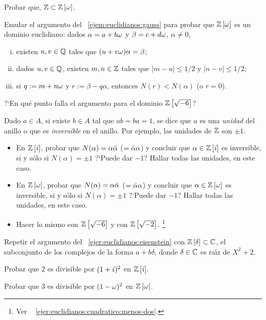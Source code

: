\begin{ejerEuclidianos}
\begin{enumerate}[(i)]
			Probar que, $\mathbb{Z}\subset{\ensuremath{\mathbb{Z}}}\left[\omega\right]$.
	\end{enumerate}
	Emular el argumento del \ejemname~\ref{ejem:euclidianos:gauss} para
	probar que ${\mathbb{Z}}\left[\omega\right]$ es un dominio euclidiano: dados
	$\alpha=a+b\omega$ y $\beta=c+d\omega$, $\alpha\neq 0$,
	\begin{enumerate}[(i)]
		\item\label{item:ejer:euclidianos:eisenstein:i}
			existen $u,v\in\mathbb{Q}$ tales que
			$(u+v\omega)\alpha=\beta$;
		\item\label{item:ejer:euclidianos:eisenstein:ii}
			dados $u,v\in\mathbb{Q}$, existen $m,n\in\mathbb{Z}$
			tales que $|m-u|\leq 1/2$ y $|n-v|\leq 1/2$;
		\item\label{item:ejer:euclidianos:eisenstein:iii}
			si $q:=m+n\omega$ y $r:=\beta-q\alpha$, entonces
			$N(r)<N(\alpha)$ (o $r=0$).
	\end{enumerate}
	?`En qu\'e punto falla el argumento para el dominio
	${\mathbb{Z}}\left[\sqrt{-6}\right]$?
\end{ejerEuclidianos}

\begin{ejerEuclidianos}\label{ejer:euclidianos:unidades}
	Dado $a\in A$, si existe $b\in A$ tal que $ab=ba=1$, se dice que
	$a$ es una \emph{unidad} del anillo o que es \emph{inversible} en el
	anillo. Por ejemplo, las unidades de $\mathbb{Z}$ son $\pm 1$.
	\begin{itemize}
		\item En ${\mathbb{Z}}\left[\mathit i\right]$, probar que
			$N(\alpha)=\alpha\bar{\alpha}$ ($=\bar{\alpha}\alpha$) y
			concluir que $\alpha\in{\ensuremath{\mathbb{Z}}}\left[\mathit i\right]$ es inversible,
			si y s\'olo si $N(\alpha)=\pm 1$ ?`Puede dar $-1$?
			Hallar todas las unidades, en este caso.
		\item En ${\mathbb{Z}}\left[\omega\right]$, probar que
			$N(\alpha)=\alpha\bar{\alpha}$ ($=\bar{\alpha}\alpha$) y
			concluir que $\alpha\in{\ensuremath{\mathbb{Z}}}\left[\omega\right]$ es
			inversible, si y s\'olo si $N(\alpha)=\pm 1$ ?`Puede
			dar $-1$? Hallar todas las unidades, en este caso.
		\item Hacer lo mismo con ${\mathbb{Z}}\left[\sqrt{-6}\right]$
			y con ${\mathbb{Z}}\left[\sqrt{-2}\right]$.%
			\footnote{
				Ver \ejername~%
				\ref{ejer:euclidianos:cuadratico:menos-dos}.
			}
	\end{itemize}
\end{ejerEuclidianos}

\begin{ejerEuclidianos}\label{ejer:euclidianos:cuadratico:menos-dos}
	Repetir el argumento del \ejername~\ref{ejer:euclidianos:eisenstein}
	con ${\mathbb{Z}}\left[\delta\right]\subset\mathbb{C}$, el subconjunto
	de los complejos de la forma $a+b\delta$, donde $\delta\in\mathbb{C}$
	es ra\'{\i}z de $X^2+2$.
\end{ejerEuclidianos}

\begin{ejerEuclidianos}
	Probar que $2$ es divisible por $(1+\mathit i)^2$ en ${\mathbb{Z}}\left[\mathit i\right]$.
\end{ejerEuclidianos}

\begin{ejerEuclidianos}
	Probar que $3$ es divisible por $(1-\omega)^2$ en
	${\mathbb{Z}}\left[\omega\right]$.
\end{ejerEuclidianos}

